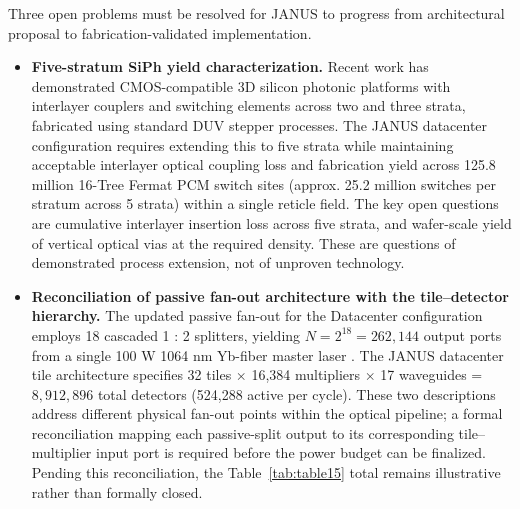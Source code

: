 \documentclass[journal]{IEEEtran}
\begin{document}
Three open problems must be resolved for JANUS to progress from architectural proposal to fabrication-validated implementation.
\begin{itemize}
\item  \textbf{Five-stratum SiPh yield characterization.} Recent work has demonstrated CMOS-compatible 3D silicon photonic platforms with interlayer couplers and switching elements across two and three strata, fabricated using standard DUV stepper processes. The JANUS datacenter configuration requires extending this to five strata while maintaining acceptable interlayer optical coupling loss and fabrication yield across 125.8 million 16-Tree Fermat PCM switch sites (approx. 25.2 million switches per stratum across 5 strata) within a single reticle field. The key open questions are cumulative interlayer insertion loss across five strata, and wafer-scale yield of vertical optical vias at the required density. These are questions of demonstrated process extension, not of unproven technology.
\item  \textbf{Reconciliation of passive fan-out architecture with the tile--detector hierarchy.} The updated passive fan-out for the Datacenter configuration employs 18 cascaded 1 : 2 splitters, yielding $N = 2^{18} = 262,144$ output ports from a single 100 W 1064 nm Yb-fiber master laser \cite{Jeong2004}. The JANUS datacenter tile architecture specifies 32 tiles $\times$ 16,384 multipliers $\times$ 17 waveguides = $8{,}912{,}896$ total detectors (524,288 active per cycle). These two descriptions address different physical fan-out points within the optical pipeline; a formal reconciliation mapping each passive-split output to its corresponding tile--multiplier input port is required before the power budget can be finalized. Pending this reconciliation, the Table~\ref{tab:table15} total remains illustrative rather than formally closed.


\end{itemize}
\end{document}
